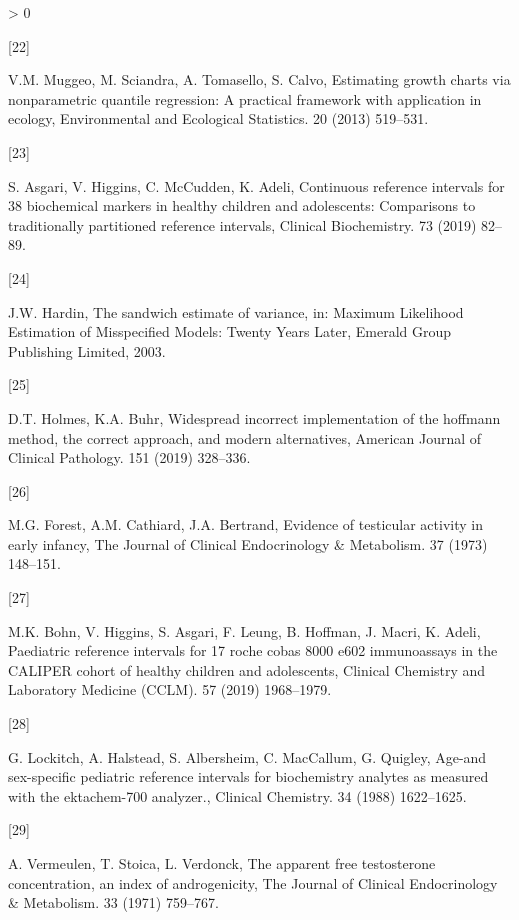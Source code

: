 \documentclass[]{elsarticle} %
\newlength{\csllabelwidth}
\newlength{\cslhangindent}
\newenvironment{CSLReferences}[3] %
 {%
  \setlength{\parindent}{0pt}
  \ifodd #1 \everypar{\setlength{\hangindent}{\cslhangindent}}\ignorespaces\fi
  \ifnum #2 > 0
  \setlength{\parskip}{#2\baselineskip}
  \fi
 }%
 {}
\newcommand{\CSLLeftMargin}[1]{\parbox[t]{\csllabelwidth}{#1}}
\newcommand{\CSLRightInline}[1]{\parbox[t]{\linewidth - \csllabelwidth}{#1}}
\begin{document}
\begin{CSLReferences}{0}{0}
\leavevmode\hypertarget{ref-quantreg2}{}%
\CSLLeftMargin{{[}22{]} }
\CSLRightInline{V.M. Muggeo, M. Sciandra, A. Tomasello, S. Calvo,
Estimating growth charts via nonparametric quantile regression: A
practical framework with application in ecology, Environmental and
Ecological Statistics. 20 (2013) 519--531.}

\leavevmode\hypertarget{ref-asgari_continuous_2019}{}%
\CSLLeftMargin{{[}23{]} }
\CSLRightInline{S. Asgari, V. Higgins, C. McCudden, K. Adeli, Continuous
reference intervals for 38 biochemical markers in healthy children and
adolescents: Comparisons to traditionally partitioned reference
intervals, Clinical Biochemistry. 73 (2019) 82--89.}

\leavevmode\hypertarget{ref-hardin2003sandwich}{}%
\CSLLeftMargin{{[}24{]} }
\CSLRightInline{J.W. Hardin, The sandwich estimate of variance, in:
Maximum Likelihood Estimation of Misspecified Models: Twenty Years
Later, Emerald Group Publishing Limited, 2003.}

\leavevmode\hypertarget{ref-holmes2019widespread}{}%
\CSLLeftMargin{{[}25{]} }
\CSLRightInline{D.T. Holmes, K.A. Buhr, Widespread incorrect
implementation of the hoffmann method, the correct approach, and modern
alternatives, American Journal of Clinical Pathology. 151 (2019)
328--336.}

\leavevmode\hypertarget{ref-forest1973evidence}{}%
\CSLLeftMargin{{[}26{]} }
\CSLRightInline{M.G. Forest, A.M. Cathiard, J.A. Bertrand, Evidence of
testicular activity in early infancy, The Journal of Clinical
Endocrinology \& Metabolism. 37 (1973) 148--151.}

\leavevmode\hypertarget{ref-bohn2019paediatric}{}%
\CSLLeftMargin{{[}27{]} }
\CSLRightInline{M.K. Bohn, V. Higgins, S. Asgari, F. Leung, B. Hoffman,
J. Macri, K. Adeli, Paediatric reference intervals for 17 roche cobas
8000 e602 immunoassays in the CALIPER cohort of healthy children and
adolescents, Clinical Chemistry and Laboratory Medicine (CCLM). 57
(2019) 1968--1979.}

\leavevmode\hypertarget{ref-lockitch1988age}{}%
\CSLLeftMargin{{[}28{]} }
\CSLRightInline{G. Lockitch, A. Halstead, S. Albersheim, C. MacCallum,
G. Quigley, Age-and sex-specific pediatric reference intervals for
biochemistry analytes as measured with the ektachem-700 analyzer.,
Clinical Chemistry. 34 (1988) 1622--1625.}

\leavevmode\hypertarget{ref-vermeulen1971apparent}{}%
\CSLLeftMargin{{[}29{]} }
\CSLRightInline{A. Vermeulen, T. Stoica, L. Verdonck, The apparent free
testosterone concentration, an index of androgenicity, The Journal of
Clinical Endocrinology \& Metabolism. 33 (1971) 759--767.}


\end{CSLReferences}
\end{document}
